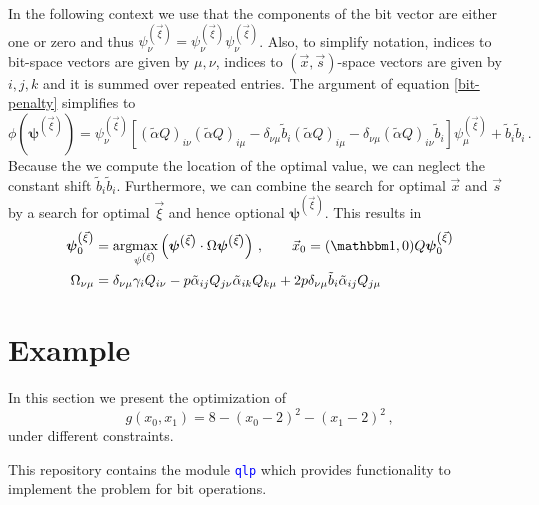 \documentclass[]{article}
\newcommand{\argmax}[1]{\text{arg}\hspace{-2pt}\max\limits_{#1}}
\newcommand{\bvec}[1]{\boldsymbol{#1}}
\newcommand{\codeword}[1]{\texttt{\textcolor{blue}{\lstinline{#1}}}
}
\begin{document}
In the following context we use that the components of the bit vector are either one or zero and thus $\psi^{\left( \vec \xi \right)}_\nu = \psi^{\left( \vec \xi \right)}_\nu \psi^{\left( \vec \xi \right)}_\nu$.
Also, to simplify notation, indices to bit-space vectors are given by $\mu, \nu$, indices to $(\vec x, \vec s)$-space vectors are given by $i, j, k$ and it is summed over repeated entries.
The argument of equation \eqref{bit-penalty} simplifies to
\begin{equation}
	\label{eq:constraint-matrix}
	\phi\left(\bvec \psi^{\left( \vec \xi \right)}\right)
	=
	\psi^{\left( \vec \xi \right)}_\nu
	\left[
		(\tilde \alpha Q)_{i\nu} (\tilde \alpha Q)_{i\mu}
		-  \delta_{\nu\mu}\tilde{b}_i (\tilde \alpha Q)_{i\mu}
		- \delta_{\nu\mu} (\tilde \alpha Q)_{i\nu} \tilde{b}_i
	\right]
	\psi^{\left( \vec \xi \right)}_\mu
	+ \tilde{b}_i \tilde{b}_i \, .
\end{equation}
Because the we compute the location of the optimal value, we can neglect the constant shift $\tilde{b}_i \tilde{b}_i$.
Furthermore, we can combine the search for optimal $\vec x$ and $\vec s$ by a search for optimal $\vec \xi$ and hence optional $\bvec \psi^{\left( \vec \xi \right)}$.
This results in
\begin{align}
	\bvec \psi^{\left( \vec \xi \right)}_{0} 
	&=
	\argmax{\psi^{\left( \vec \xi \right)}}\left( 
		\bvec \psi^{\left( \vec \xi \right)} \cdot \Omega \bvec \psi^{\left( \vec \xi \right)}
	\right)
	\, , \qquad
	\vec x_0 =  (\mathbbm 1, 0) Q \bvec \psi^{\left( \vec \xi \right)}_{0} 
	\\
	\Omega_{\nu\mu}
	&=
	\delta_{\nu\mu} \gamma_i Q_{i\nu}
	- p \tilde \alpha_{ij} Q_{j\nu} \tilde \alpha_{ik} Q_{k\mu}
	+ 2 p \delta_{\nu\mu}\tilde{b}_i \tilde \alpha_{ij} Q_{j\mu}
\end{align}

\section{Example}
In this section we present the optimization of
\begin{equation}
	\label{eq:g}
	g(x_0, x_1) = 8 -(x_0 - 2)^2 - (x_1 - 2)^2 \, ,
\end{equation}
under different constraints.

This repository contains the module \codeword{qlp} which provides functionality to implement the problem for bit operations.
\end{document}
